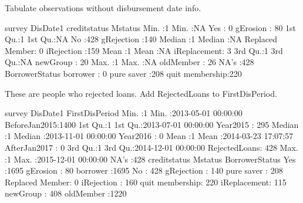 Tabulate observations without disbursement date info. 
\begin{Schunk}
\begin{Soutput}
     survey     DisDate1            creditstatus         Mstatus   
 Min.   :1   Min.   :NA    Yes            :  0   gErosion    : 80  
 1st Qu.:1   1st Qu.:NA    No             :428   gRejection  :140  
 Median :1   Median :NA    Replaced Member:  0   iRejection  :159  
 Mean   :1   Mean   :NA                          iReplacement:  3  
 3rd Qu.:1   3rd Qu.:NA                          newGroup    : 20  
 Max.   :1   Max.   :NA                          oldMember   : 26  
             NA's   :428                                           
         BorrowerStatus
 borrower       :  0   
 pure saver     :208   
 quit membership:220   
                       
                       
                       
                       
\end{Soutput}
\end{Schunk}
These are people who rejected loans. Add \textsf{RejectedLoans} to \textsf{FirstDisPeriod}. \gobblepars
\begin{Schunk}
\begin{Soutput}
     survey     DisDate1                         FirstDisPeriod
 Min.   :1   Min.   :2013-05-01 00:00:00   BeforeJan2015:1400  
 1st Qu.:1   1st Qu.:2013-07-01 00:00:00   Year2015     : 295  
 Median :1   Median :2013-11-01 00:00:00   Year2016     :   0  
 Mean   :1   Mean   :2014-03-23 17:07:57   AfterJan2017 :   0  
 3rd Qu.:1   3rd Qu.:2014-12-01 00:00:00   RejectedLoans: 428  
 Max.   :1   Max.   :2015-12-01 00:00:00                       
             NA's   :428                                       
          creditstatus          Mstatus             BorrowerStatus
 Yes            :1695   gErosion    :  80   borrower       :1695  
 No             : 428   gRejection  : 140   pure saver     : 208  
 Replaced Member:   0   iRejection  : 160   quit membership: 220  
                        iReplacement: 115                         
                        newGroup    : 408                         
                        oldMember   :1220                         
                                                                  
\end{Soutput}
\end{Schunk}


